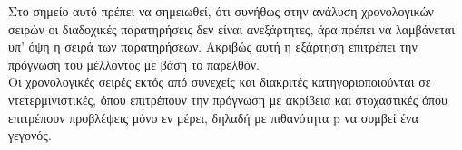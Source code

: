Στο σημείο αυτό πρέπει να σημειωθεί, ότι συνήθως στην ανάλυση
χρονολογικών σειρών οι διαδοχικές παρατηρήσεις δεν είναι ανεξάρτητες, άρα πρέπει
να λαμβάνεται υπ’ όψη η σειρά των παρατηρήσεων. Ακριβώς αυτή η εξάρτηση
επιτρέπει την πρόγνωση του μέλλοντος με βάση το παρελθόν.\\

Οι χρονολογικές σειρές εκτός από συνεχείς και διακριτές κατηγοριοποιούνται
σε ντετερμινιστικές, όπου επιτρέπουν την πρόγνωση με ακρίβεια και στοχαστικές
όπου επιτρέπουν προβλέψεις μόνο εν μέρει, δηλαδή με πιθανότητα p να συμβεί ένα
γεγονός.
%
%
%
%
%
%


